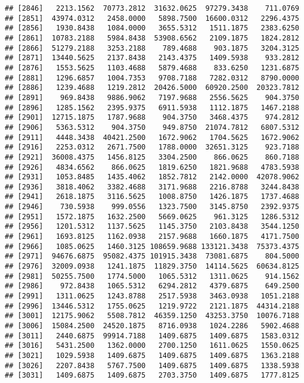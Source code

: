 \documentclass[]{article}
\begin{document}
\begin{verbatim}
## [2846]   2213.1562  70773.2812  31632.0625  97279.3438    711.0769
## [2851]  43974.0312   2458.0000   5898.7500  16600.0312   2296.4375
## [2856]   1930.8438   1084.0000   3655.5312   1511.1875   2383.6250
## [2861]  10783.2188   5984.8438  53908.6562   2109.1875   1824.2812
## [2866]  51279.2188   3253.2188    789.4688    903.1875   3204.3125
## [2871]  13440.5625   2137.8438   2143.4375   1409.5938    933.2812
## [2876]   1553.5625   1103.4688   5879.4688    833.6250   1231.6875
## [2881]   1296.6857   1004.7353   9708.7188   7282.0312   8790.0000
## [2886]   1239.4688   1219.2812  20426.5000  60920.2500  20323.7812
## [2891]    969.8438   9886.9062   7197.9688   2556.5625    904.3750
## [2896]   1285.1562   2395.9375   6911.5938   1112.1875   1467.2188
## [2901]  12715.1875   1787.9688    904.3750   3468.4375    974.2812
## [2906]   5363.5312    904.3750    949.8750  21074.7812   6807.5312
## [2911]   4448.3438  40421.2500   1672.9062   1704.5625   1672.9062
## [2916]   2253.0312   2671.7500   1788.0000  32651.3125    923.7188
## [2921]  36008.4375   1456.8125   3304.2500    866.0625    860.7188
## [2926]   4834.6562    866.0625   1819.6250   1821.9688   4783.5938
## [2931]   1053.8485   1435.4062   1852.7812   2142.0000  42078.9062
## [2936]   3818.4062   3382.4688   3171.9688   2216.8788   3244.8438
## [2941]   2618.1875   3116.5625   1008.8750   1426.1875   1737.4688
## [2946]    730.5938    999.0556   1323.7500   3145.8750   2392.9375
## [2951]   1572.1875   1632.2500   5669.0625    961.3125   1286.5312
## [2956]   1201.5312   1137.5625   1145.3750   2103.8438   3544.1250
## [2961]   1693.8125   1162.0938   2157.9688   1660.1875   4171.7500
## [2966]   1085.0625   1460.3125 108659.9688 133121.3438  75373.4375
## [2971]  94676.6875  95082.4375 101915.3438  73081.6875    804.5000
## [2976]  32009.0938   1241.1875  11829.3750  14114.5625  60634.8125
## [2981]  50255.7500   1774.5000   1065.5312   1311.0625    914.1562
## [2986]    972.8438   1065.5312   6294.2812   4379.6875    649.2500
## [2991]   1311.0625   1243.8788   2517.5938   3463.0938   1051.2188
## [2996]  13446.5312   1755.0625   1219.9722   2121.1875  44314.2188
## [3001]  12175.9062   5508.7812  46359.1250  43253.3750  10076.7188
## [3006]  15084.2500  24520.1875   8716.0938   1024.2286   5902.4688
## [3011]   2440.6875  99914.7188   1409.6875   1409.6875   1583.0312
## [3016]   5431.2500   1362.0000   2700.1250   1611.0625   1550.0625
## [3021]   1029.5938   1409.6875   1409.6875   1409.6875   1363.2188
## [3026]   2207.8438   5767.7500   1409.6875   1409.6875   1338.5938
## [3031]   1409.6875   1409.6875   2703.3750   1409.6875   1777.8125

\end{verbatim}
\end{document}
